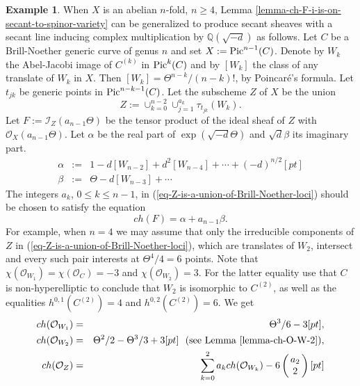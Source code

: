 \documentclass[12pt]{amsart}
\numberwithin{equation}{subsection}
\theoremstyle{plain}
\theoremstyle{definition}
\newtheorem{example}[thm]{Example}
\newcommand{\QQ}{{\mathbb Q}}
\newcommand{\StructureSheaf}[1]{{\mathcal O}_{#1}}
\newcommand{\Pic}{{\rm Pic}}
\newcommand{\Ideal}[1]{{\mathcal I}_{#1}}
\newcommand{\Choose}[2]
{\left(\!\!\begin{array}{c}#1\\#2\end{array}\!\!\right)}
\begin{document}
\begin{example}
\label{example-secant-sheaf-on-jacobian-of-genus-4-curve}
When $X$ is an abelian $n$-fold, $n\geq 4$, Lemma \ref{lemma-ch-F-i-is-on-secant-to-spinor-variety} can be generalized to produce secant sheaves with a secant line inducing complex multiplication by $\QQ(\sqrt{-d})$ as follows. Let $C$ be a Brill-Noether generic curve of genus $n$ and set $X:=\Pic^{n-1}(C)$. Denote by $W_k$ the Abel-Jacobi image of $C^{(k)}$ in $\Pic^k(C)$ and by $[W_k]$ 
 the class of any translate of $W_k$ in $X$. Then $[W_k]=\Theta^{n-k}/(n-k)!$, by Poincar\'{e}'s formula. Let $t_{jk}$ be generic points in $\Pic^{n-k-1}(C)$.
Let the subscheme $Z$ of $X$ be the union 
\begin{equation}
\label{eq-Z-is-a-union-of-Brill-Noether-loci}
Z:=\cup_{k=0}^{n-2} \cup_{j=1}^{a_k}\tau_{t_{jk}}(W_k).
\end{equation}
Let $F:=\Ideal{Z}(a_{n-1}\Theta)$ be the tensor product of the ideal sheaf of $Z$ with $\StructureSheaf{X}(a_{n-1}\Theta)$. 
Let $\alpha$ be the real part of $\exp(\sqrt{-d}\Theta)$ and $\sqrt{d}\beta$ its imaginary part.
\begin{eqnarray*}
\alpha &:=& 1-d[W_{n-2}]+d^2[W_{n-4}] + \cdots + (-d)^{n/2}[pt]
\\
\beta & := & \Theta -d[W_{n-3}]+\cdots
\end{eqnarray*}
The integers $a_k$, $0\leq k\leq n-1$, in (\ref{eq-Z-is-a-union-of-Brill-Noether-loci}) should be chosen to satisfy the equation 
\begin{equation}
\label{eq-coefficients-of-a-secant-sheaf}
ch(F)=\alpha+a_{n-1}\beta.
\end{equation}
For example, when $n=4$ we may assume that only the irreducible components of $Z$ in (\ref{eq-Z-is-a-union-of-Brill-Noether-loci}), which are translates of $W_2$, intersect and every such pair interests at $\Theta^4/4=6$ points. Note that $\chi(\StructureSheaf{W_1})=\chi(\StructureSheaf{C})=-3$ and 
$\chi(\StructureSheaf{W_2})=3$. For the latter equality use that $C$ is non-hyperelliptic to conclude that $W_2$ is isomorphic to $C^{(2)}$, as well as the equalities $h^{0,1}(C^{(2)})=4$ and $h^{0,2}(C^{(2)})=6$. We get  
\begin{eqnarray*}
ch(\StructureSheaf{W_1})&=& \Theta^3/6-3[pt],
\\
ch(\StructureSheaf{W_2})&=&\Theta^2/2 -\Theta^3/3+3[pt] \ \ \mbox{(see Lemma \ref{lemma-ch-O-W-2})},
\\
ch(\StructureSheaf{Z})&=&\sum_{k=0}^{2}a_k ch(\StructureSheaf{W_k})-6\Choose{a_2}{2}[pt]

\end{eqnarray*}
\end{example}
\end{document}
